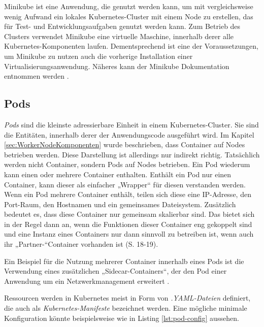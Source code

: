 \documentclass[11pt,a4paper]{article}
\begin{document}
Minikube ist eine Anwendung, die genutzt werden kann, um mit vergleichsweise wenig Aufwand ein lokales
Kubernetes-Cluster mit einem Node zu erstellen, das für Test- und Entwicklungsaufgaben genutzt werden kann.
Zum Betrieb des Clusters verwendet Minikube eine virtuelle Maschine, innerhalb derer
alle Kubernetes-Komponenten laufen. Dementsprechend ist eine der Voraussetzungen,
um Minikube zu nutzen auch die vorherige Installation einer Virtualisierungsanwendung.
Näheres kann der Minikube Dokumentation entnommen werden \cite{minikube}.

\subsection{Pods}
\emph{Pods} sind die kleinste adressierbare Einheit in einem Kubernetes-Cluster.
Sie sind die Entitäten, innerhalb derer der Anwendungscode ausgeführt wird.
Im Kapitel \ref{sec:WorkerNodeKomponenten} wurde beschrieben, dass Container auf Nodes betrieben werden.
Diese Darstellung ist allerdings nur indirekt richtig. Tatsächlich werden nicht Container,
sondern Pods auf Nodes betrieben.
Ein Pod wiederum kann einen oder mehrere Container enthalten. Enthält ein Pod nur einen Container,
kann dieser als einfacher „Wrapper“ für diesen verstanden werden.
Wenn ein Pod mehrere Container enthält, teilen sich diese eine IP-Adresse,
den Port-Raum, den Hostnamen und ein gemeinsames Dateisystem.
Zusätzlich bedeutet es, dass diese Container nur gemeinsam skalierbar sind.
Das bietet sich in der Regel dann an, wenn die Funktionen dieser Container eng gekoppelt sind und eine Instanz eines
Containers nur dann sinnvoll zu betreiben ist, wenn auch ihr „Partner-“Container vorhanden ist \cite{9783969109625} \cite{Schmeling_Dargatz_2022} (S. 18-19).

Ein Beispiel für die Nutzung mehrerer Container innerhalb eines Pods ist die Verwendung
eines zusätzlichen „Sidecar-Containers“, der den Pod einer Anwendung um ein Netzwerkmanagement erweitert \cite{9783969109625}.

Ressourcen werden in Kubernetes meist in Form von \emph{.YAML-Dateien} definiert,
die auch als \emph{Kubernetes-Manifeste} bezeichnet werden.
Eine mögliche minimale Konfiguration könnte beispielsweise wie in Listing \ref{lst:pod-config} aussehen.


\end{document}
